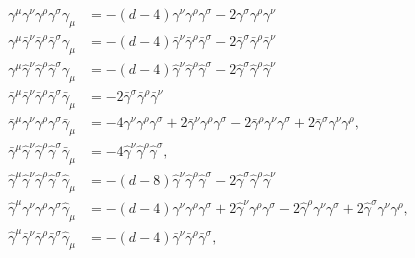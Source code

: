 \documentclass[../FeynCalcManual.tex]{subfiles}
\begin{document}
\begin{align}
\gamma^\mu \gamma^\nu \gamma^\rho \gamma^\sigma \gamma_\mu &= -(d-4) \gamma^\nu \gamma^\rho \gamma^\sigma -2 \gamma^\sigma \gamma^\rho \gamma^\nu \\
\gamma^\mu \bar{\gamma}^\nu \bar{\gamma}^\rho \bar{\gamma}^\sigma \gamma_\mu &=-(d-4) \bar{\gamma}^\nu \bar{\gamma}^\rho \bar{\gamma}^\sigma -2 \bar{\gamma}^\sigma \bar{\gamma}^\rho \bar{\gamma}^\nu  \\
\gamma^\mu \hat{\gamma}^\nu \hat{\gamma}^\rho \hat{\gamma}^\sigma \gamma_\mu &= -(d-4) \hat{\gamma}^\nu \hat{\gamma}^\rho \hat{\gamma}^\sigma -2 \hat{\gamma}^\sigma \hat{\gamma}^\rho \hat{\gamma}^\nu  \\
\bar{\gamma}^\mu \bar{\gamma}^\nu \bar{\gamma}^\rho \bar{\gamma}^\sigma \bar{\gamma}_\mu &= -2 \bar{\gamma}^\sigma \bar{\gamma}^\rho \bar{\gamma}^\nu \\
\bar{\gamma}^\mu \gamma^\nu \gamma^\rho  \gamma^\sigma \bar{\gamma}_\mu &= -4 \gamma^\nu \gamma^\rho \gamma^\sigma + 2 \bar{\gamma}^\nu \gamma^\rho \gamma^\sigma - 2\bar{\gamma}^\rho \gamma^\nu \gamma^\sigma + 2 \bar{\gamma}^\sigma \gamma^\nu \gamma^\rho, \\
\bar{\gamma}^\mu \hat{\gamma}^\nu \hat{\gamma}^\rho \hat{\gamma}^\sigma \bar{\gamma}_\mu &= - 4 \hat{\gamma}^\nu \hat{\gamma}^\rho \hat{\gamma}^\sigma , \\
\hat{\gamma}^\mu \hat{\gamma}^\nu \hat{\gamma}^\rho \hat{\gamma}^\sigma \hat{\gamma}_\mu &= -(d-8) \hat{\gamma}^\nu \hat{\gamma}^\rho \hat{\gamma}^\sigma -2  \hat{\gamma}^\sigma \hat{\gamma}^\rho \hat{\gamma}^\nu \\
\hat{\gamma}^\mu \gamma^\nu \gamma^\rho \gamma^\sigma \hat{\gamma}_\mu &= -(d-4) \gamma^\nu \gamma^\rho \gamma^\sigma + 2 \hat{\gamma}^\nu \gamma^\rho \gamma^\sigma - 2\hat{\gamma}^\rho \gamma^\nu \gamma^\sigma + 2 \hat{\gamma}^\sigma \gamma^\nu \gamma^\rho,  \\
\hat{\gamma}^\mu \bar{\gamma}^\nu \bar{\gamma}^\rho \bar{\gamma}^\sigma \hat{\gamma}_\mu &= -(d-4) \bar{\gamma}^\nu \bar{\gamma}^\rho \bar{\gamma}^\sigma,
\end{align}
\end{document}
